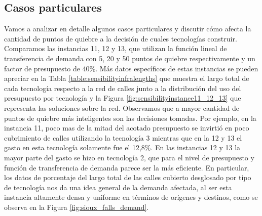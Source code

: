 \clearpage
\subsection*{Casos particulares}

Vamos a analizar en detalle algunos casos particulares y discutir cómo afecta la cantidad de puntos de quiebre a la decisión de cuales tecnologías construir. Comparamos las instancias 11, 12 y 13, que utilizan la función lineal de transferencia de demanda con 5, 20 y 50 puntos de quiebre respectivamente y un factor de presupuesto de 40\%. Más datos específicos de estas instancias se pueden apreciar en la Tabla \ref{table:sensibilityinfralengths} que muestra el largo total de cada tecnología respecto a la red de calles junto a la distribución del uso del presupuesto por tecnología y la Figura \ref{fig:sensibilityinstance11_12_13} que representa las soluciones sobre la red. Observamos que a mayor cantidad de puntos de quiebre más inteligentes son las decisiones tomadas. Por ejemplo, en la instancia 11, poco mas de la mitad del acotado presupuesto se invirtió en poco cubrimiento de calles utilizando la tecnología 3 mientras que en la 12 y 13 el gasto en esta tecnología solamente fue el 12,8\%. En las instancias 12 y 13 la mayor parte del gasto se hizo en tecnología 2, que para el nivel de presupuesto y función de transferencia de demanda parece ser la más eficiente. En particular, los datos de porcentaje del largo total de las calles cubierto desglosado por tipo de tecnología nos da una idea general de la demanda afectada, al ser esta instancia altamente densa y uniforme en términos de orígenes y destinos, como se observa en la Figura \ref{fig:sioux_falls_demand}.

